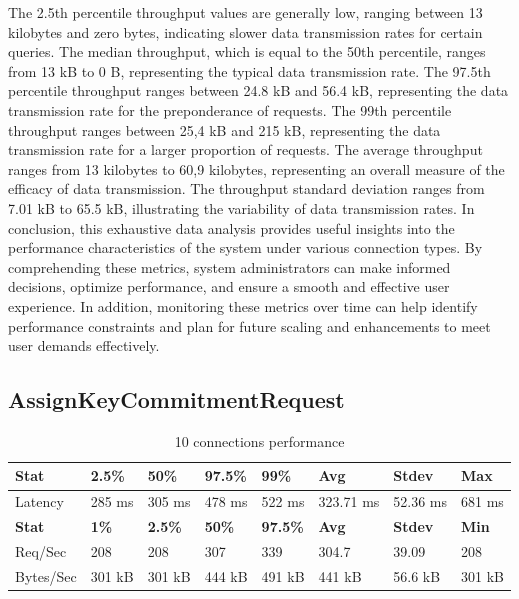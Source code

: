 \documentclass[../Main.tex]{subfiles}
\begin{document}
\indent The 2.5th percentile throughput values are generally low, ranging between 13 kilobytes and zero bytes, indicating slower data transmission rates for certain queries. The median throughput, which is equal to the 50th percentile, ranges from 13 kB to 0 B, representing the typical data transmission rate. The 97.5th percentile throughput ranges between 24.8 kB and 56.4 kB, representing the data transmission rate for the preponderance of requests. The 99th percentile throughput ranges between 25,4 kB and 215 kB, representing the data transmission rate for a larger proportion of requests. The average throughput ranges from 13 kilobytes to 60,9 kilobytes, representing an overall measure of the efficacy of data transmission. The throughput standard deviation ranges from 7.01 kB to 65.5 kB, illustrating the variability of data transmission rates. In conclusion, this exhaustive data analysis provides useful insights into the performance characteristics of the system under various connection types. By comprehending these metrics, system administrators can make informed decisions, optimize performance, and ensure a smooth and effective user experience. In addition, monitoring these metrics over time can help identify performance constraints and plan for future scaling and enhancements to meet user demands effectively.

\subsection{AssignKeyCommitmentRequest}

\begin{table}[H]
  \centering
\begin{tabular}{|l|l|l|l|l|l|l|l|}
\hline
\rowcolor[HTML]{f56b00}
\textbf{Stat} & \textbf{2.5\%} & \textbf{50\%} & \textbf{97.5\%} & \textbf{99\%} & \textbf{Avg} & \textbf{Stdev} & \textbf{Max} \\
\hline
Latency & 285 ms & 305 ms & 478 ms & 522 ms & 323.71 ms & 52.36 ms & 681 ms \\
\hline
\rowcolor[HTML]{f56b00}
\textbf{Stat} & \textbf{1\%} & \textbf{2.5\%} & \textbf{50\%} & \textbf{97.5\%} & \textbf{Avg} & \textbf{Stdev} & \textbf{Min} \\
\hline
Req/Sec & 208 & 208 & 307 & 339 & 304.7 & 39.09 & 208 \\
Bytes/Sec & 301 kB & 301 kB & 444 kB & 491 kB & 441 kB & 56.6 kB & 301 kB \\
\hline
\end{tabular}
 \caption{10 connections performance}
 \label{10-connections-performance}
\end{table}
\end{document}
